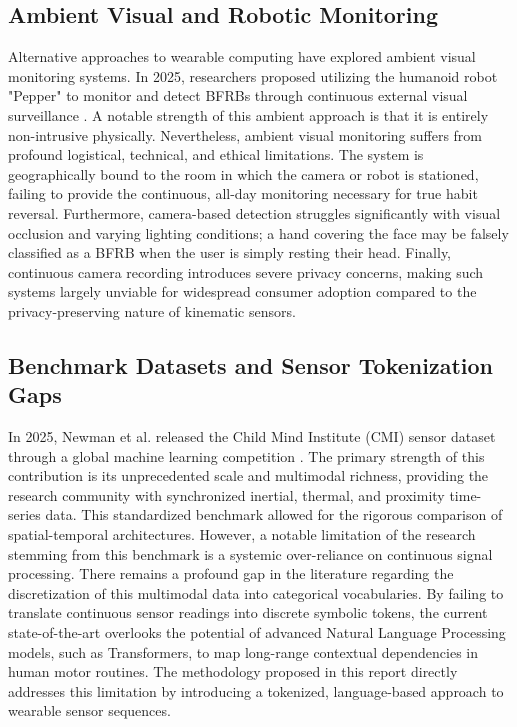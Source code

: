 \documentclass[conference]{IEEEtran}
\begin{document}
\subsection{Ambient Visual and Robotic Monitoring}
Alternative approaches to wearable computing have explored ambient visual monitoring systems. In 2025, researchers proposed utilizing the humanoid robot "Pepper" to monitor and detect BFRBs through continuous external visual surveillance \cite{roboteye2025}. A notable strength of this ambient approach is that it is entirely non-intrusive physically. Nevertheless, ambient visual monitoring suffers from profound logistical, technical, and ethical limitations. The system is geographically bound to the room in which the camera or robot is stationed, failing to provide the continuous, all-day monitoring necessary for true habit reversal. Furthermore, camera-based detection struggles significantly with visual occlusion and varying lighting conditions; a hand covering the face may be falsely classified as a BFRB when the user is simply resting their head. Finally, continuous camera recording introduces severe privacy concerns, making such systems largely unviable for widespread consumer adoption compared to the privacy-preserving nature of kinematic sensors.

\subsection{Benchmark Datasets and Sensor Tokenization Gaps}
In 2025, Newman et al. released the Child Mind Institute (CMI) sensor dataset through a global machine learning competition \cite{newman2025cmi}. The primary strength of this contribution is its unprecedented scale and multimodal richness, providing the research community with synchronized inertial, thermal, and proximity time-series data. This standardized benchmark allowed for the rigorous comparison of spatial-temporal architectures. However, a notable limitation of the research stemming from this benchmark is a systemic over-reliance on continuous signal processing. There remains a profound gap in the literature regarding the discretization of this multimodal data into categorical vocabularies. By failing to translate continuous sensor readings into discrete symbolic tokens, the current state-of-the-art overlooks the potential of advanced Natural Language Processing models, such as Transformers, to map long-range contextual dependencies in human motor routines. The methodology proposed in this report directly addresses this limitation by introducing a tokenized, language-based approach to wearable sensor sequences.
\end{document}
